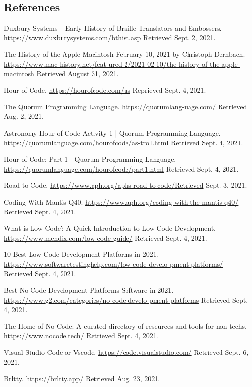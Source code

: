 \documentclass[11.5pt]{sig-alternate}
\begin{document}
\begin{large}
 
\section*{ References}\par 

\leftskip 0.25in
\parindent -0.25in 

Duxbury Systems -- Early History of Braille Translators and Embossers. \url{https://www.duxburysystems.com/bthist.asp} Retrieved Sept. 2, 2021.

The History of the Apple Macintosh February 10, 2021 by Christoph Dernbach. \url{https://www.mac-history.net/feat-ured-2/2021-02-10/the-history-of-the-apple-macintosh} Retrieved August 31, 2021.

Hour of Code. \url{https://hourofcode.com/us} Reprieved Sept. 4, 2021.

The Quorum Programming Language. \url{https://quorumlang-uage.com/} Retrieved Aug. 2, 2021. 
  
Astronomy Hour of Code Activity 1 | Quorum Programming Language. \url{https://quorumlanguage.com/hourofcode/as-tro1.html} Retrieved Sept. 4, 2021.

Hour of Code: Part 1 | Quorum Programming Language. \url{https://quorumlanguage.com/hourofcode/part1.html} Retrieved Sept. 4, 2021.

Road to Code. \url{https://www.aph.org/aphs-road-to-code/Retrieved} Sept. 3, 2021.
  
Coding With Mantis Q40. \url{https://www.aph.org/coding-with-the-mantis-q40/} Retrieved Sept. 4, 2021.

What is Low-Code? A Quick Introduction to Low-Code Development. \url{https://www.mendix.com/low-code-guide/} Retrieved Sept. 4, 2021.

10 Best Low-Code Development Platforms in 2021. \url{https://www.softwaretestinghelp.com/low-code-develo-pment-platforms/} Retrieved Sept. 4, 2021.

Best No-Code Development Platforms Software in 2021. \url{https://www.g2.com/categories/no-code-develo-pment-platforms} Retrieved Sept. 4, 2021.
  
The Home of No-Code: A curated directory of resources and tools for non-techs. \url{https://www.nocode.tech/} Retrieved Sept. 4, 2021.

Visual Studio Code or Vscode. \url{https://code.visualstudio.com/} Retrieved Sept. 6, 2021.
  
Brltty. \url{https://brltty.app/} Retrieved Aug. 23, 2021.
 

\end{large}
\end{document}
